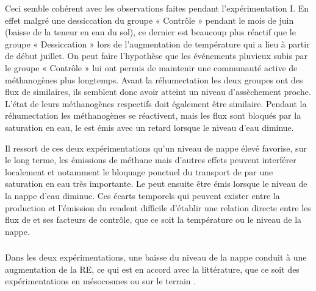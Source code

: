 Ceci semble cohérent avec les observations faites pendant l'expérimentation I.
En effet malgré une dessiccation du groupe « Contrôle » pendant le mois de juin (baisse de la teneur en eau du sol), ce dernier est beaucoup plus réactif que le groupe « Dessiccation » lors de l'augmentation de température qui a lieu à partir de début juillet.
On peut faire l'hypothèse que les événements pluvieux subis par le groupe « Contrôle » lui ont permis de maintenir une communauté active de méthanogènes plus longtemps.
Avant la réhumectation les deux groupes ont des flux de \chh similaires, ils semblent donc avoir atteint un niveau d'assèchement proche.
L'état de leurs méthanogènes respectifs doit également être similaire.
Pendant la réhumectation les méthanogènes se réactivent, mais les flux sont bloqués par la saturation en eau, le \chh est émis avec un retard lorsque le niveau d'eau diminue.

Il ressort de ces deux expérimentations qu'un niveau de nappe élevé favorise, sur le long terme, les émissions de méthane mais d'autres effets peuvent interférer localement et notamment le bloquage ponctuel du transport de \chh par une saturation en eau très importante.
Le \chh peut ensuite être émis lorsque le niveau de la nappe d'eau diminue.
Ces écarts temporels qui peuvent exister entre la production et l'émission du \chh rendent difficile d'établir une relation directe entre les flux de \chh et ses facteurs de contrôle, que ce soit la température ou le niveau de la nappe.


\subsubsection{\coo}

Dans les deux expérimentations, une baisse du niveau de la nappe conduit à une augmentation de la RE, ce qui est en accord avec la littérature, que ce soit des expérimentations en mésocosmes \citet{blodau2004,dinsmore2009} ou sur le terrain \citet{ballantyne2014}. 

